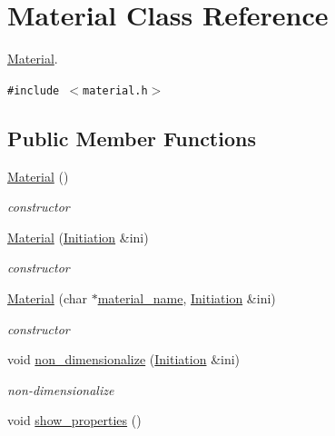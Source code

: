 \hypertarget{classMaterial}{
\section{Material Class Reference}
\label{classMaterial}
}
\hyperlink{classMaterial}{Material}.  


{\tt \#include $<$material.h$>$}

\subsection*{Public Member Functions}
\begin{CompactItemize}
\item 
\hypertarget{classMaterial_137e987401b63eb7c6c27c3e38bc74b5}{
\hyperlink{classMaterial_137e987401b63eb7c6c27c3e38bc74b5}{Material} ()}
\label{classMaterial_137e987401b63eb7c6c27c3e38bc74b5}

\begin{CompactList}\small\item\em constructor \item\end{CompactList}\item 
\hypertarget{classMaterial_8232db4572229d207a6438cf37b0c548}{
\hyperlink{classMaterial_8232db4572229d207a6438cf37b0c548}{Material} (\hyperlink{classInitiation}{Initiation} \&ini)}
\label{classMaterial_8232db4572229d207a6438cf37b0c548}

\begin{CompactList}\small\item\em constructor \item\end{CompactList}\item 
\hyperlink{classMaterial_16e68aae88c0ecd98a88654e4648aa75}{Material} (char $\ast$\hyperlink{classMaterial_d7d10964971b23171efeac3c801371cf}{material\_\-name}, \hyperlink{classInitiation}{Initiation} \&ini)
\begin{CompactList}\small\item\em constructor \item\end{CompactList}\item 
\hypertarget{classMaterial_7319953e9448604807d6e9301eea6986}{
void \hyperlink{classMaterial_7319953e9448604807d6e9301eea6986}{non\_\-dimensionalize} (\hyperlink{classInitiation}{Initiation} \&ini)}
\label{classMaterial_7319953e9448604807d6e9301eea6986}

\begin{CompactList}\small\item\em non-dimensionalize \item\end{CompactList}\item 
\hypertarget{classMaterial_1c79d7b457fd73587612d34c687f4286}{
void \hyperlink{classMaterial_1c79d7b457fd73587612d34c687f4286}{show\_\-properties} ()}
\label{classMaterial_1c79d7b457fd73587612d34c687f4286}


\end{CompactItemize}
